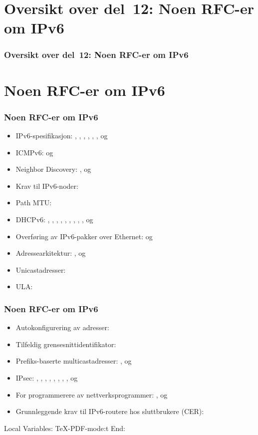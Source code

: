 \begin{frame}
  \partpage
\end{frame}

\section*{Oversikt over del~12: Noen RFC-er om IPv6}
\begin{frame}[allowframebreaks]
  \frametitle{Oversikt over del~12: Noen RFC-er om IPv6}
    \tableofcontents%
\end{frame}

\section{Noen RFC-er om IPv6}
\begin{frame}%
  \frametitle{Noen RFC-er om IPv6}
  \begin{itemize}%
  \item IPv6-spesifikasjon: , , ,
    , , ,  og 
  \item ICMPv6:  og 
  \item Neighbor Discovery: ,  og 
  \item Krav til IPv6-noder: 
  \item Path MTU: 
  \item DHCPv6: , , , ,
    , , , , ,
     og 
  \item Overføring av IPv6-pakker over Ethernet:  og
  \item Adressearkitektur: ,  og 
  \item Unicastadresser: 
  \item ULA: 
  \end{itemize}
\end{frame}

\begin{frame}%
  \frametitle{Noen RFC-er om IPv6}
  \begin{itemize}%
  \item Autokonfigurering av adresser: 
  \item Tilfeldig grensesnittidentifikator: 
  \item Prefiks-baserte multicastadresser: ,  og
  \item IPsec: , , , ,
    , , , ,  og
  \item For programmerere av nettverksprogrammer: ,
     og 
  \item Grunnleggende krav til IPv6-routere hos sluttbrukere (CER):
  \end{itemize}
\end{frame}



Local Variables:
TeX-PDF-mode:t
End:
